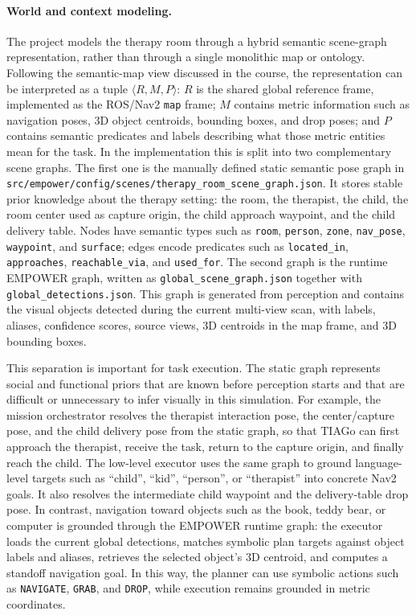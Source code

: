\paragraph{World and context modeling.}
The project models the therapy room through a hybrid semantic scene-graph representation, rather than through a single monolithic map or ontology. Following the semantic-map view discussed in the course, the representation can be interpreted as a tuple $\langle R, M, P\rangle$: $R$ is the shared global reference frame, implemented as the ROS/Nav2 \texttt{map} frame; $M$ contains metric information such as navigation poses, 3D object centroids, bounding boxes, and drop poses; and $P$ contains semantic predicates and labels describing what those metric entities mean for the task. In the implementation this is split into two complementary scene graphs. The first one is the manually defined static semantic pose graph in \texttt{src/empower/config/scenes/therapy\_room\_scene\_graph.json}. It stores stable prior knowledge about the therapy setting: the room, the therapist, the child, the room center used as capture origin, the child approach waypoint, and the child delivery table. Nodes have semantic types such as \texttt{room}, \texttt{person}, \texttt{zone}, \texttt{nav\_pose}, \texttt{waypoint}, and \texttt{surface}; edges encode predicates such as \texttt{located\_in}, \texttt{approaches}, \texttt{reachable\_via}, and \texttt{used\_for}. The second graph is the runtime EMPOWER graph, written as \texttt{global\_scene\_graph.json} together with \texttt{global\_detections.json}. This graph is generated from perception and contains the visual objects detected during the current multi-view scan, with labels, aliases, confidence scores, source views, 3D centroids in the map frame, and 3D bounding boxes.

This separation is important for task execution. The static graph represents social and functional priors that are known before perception starts and that are difficult or unnecessary to infer visually in this simulation. For example, the mission orchestrator resolves the therapist interaction pose, the center/capture pose, and the child delivery pose from the static graph, so that TIAGo can first approach the therapist, receive the task, return to the capture origin, and finally reach the child. The low-level executor uses the same graph to ground language-level targets such as ``child'', ``kid'', ``person'', or ``therapist'' into concrete Nav2 goals. It also resolves the intermediate child waypoint and the delivery-table drop pose. In contrast, navigation toward objects such as the book, teddy bear, or computer is grounded through the EMPOWER runtime graph: the executor loads the current global detections, matches symbolic plan targets against object labels and aliases, retrieves the selected object's 3D centroid, and computes a standoff navigation goal. In this way, the planner can use symbolic actions such as \texttt{NAVIGATE}, \texttt{GRAB}, and \texttt{DROP}, while execution remains grounded in metric coordinates.


